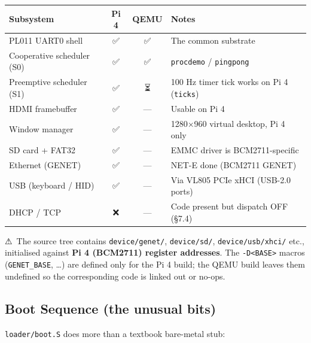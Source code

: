 \documentclass[a4paper,11pt]{article}
\begin{document}
\begin{center}\footnotesize
\begin{tabular}{@{}l c c p{6.6cm}@{}}
\toprule
\textbf{Subsystem} & \textbf{Pi 4} & \textbf{QEMU} & \textbf{Notes}\\
\midrule
PL011 UART0 shell          & ✅ & ✅ & The common substrate\\
Cooperative scheduler (S0) & ✅ & ✅ & \verb|procdemo| / \verb|pingpong|\\
Preemptive scheduler (S1)  & ✅ & ⏳ & 100 Hz timer tick works on Pi 4 (\verb|ticks|)\\
HDMI framebuffer           & ✅ & — & Usable on Pi 4\\
Window manager             & ✅ & — & 1280×960 virtual desktop, Pi 4 only\\
SD card + FAT32            & ✅ & — & EMMC driver is BCM2711-specific\\
Ethernet (GENET)           & ✅ & — & NET-E done (BCM2711 GENET)\\
USB (keyboard / HID)       & ✅ & — & Via VL805 PCIe xHCI (USB-2.0 ports)\\
DHCP / TCP                 & ❌ & — & Code present but dispatch OFF (§7.4)\\
\bottomrule
\end{tabular}
\end{center}

⚠~The source tree contains \texttt{device/genet/}, \texttt{device/sd/},
\texttt{device/usb/xhci/} etc., initialised against \textbf{Pi 4 (BCM2711)
register addresses}. The \verb|-D<BASE>| macros (\verb|GENET_BASE|, \dots) are
defined only for the Pi 4 build; the QEMU build leaves them undefined so the
corresponding code is linked out or no-ops.

\subsection{Boot Sequence (the unusual bits)}

\texttt{loader/boot.S} does more than a textbook bare-metal stub:
\end{document}
